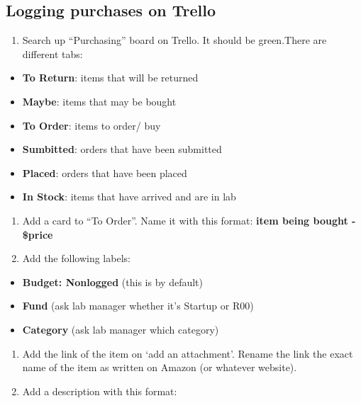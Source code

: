 \documentclass[]{book}
\providecommand{\tightlist}{%
  \setlength{\itemsep}{0pt}\setlength{\parskip}{0pt}}
\begin{document}
\hypertarget{logging-purchases-on-trello}{%
\subsection{Logging purchases on Trello}\label{logging-purchases-on-trello}}

\begin{enumerate}
\def\labelenumi{\arabic{enumi}.}
\tightlist
\item
  Search up ``Purchasing'' board on Trello. It should be green.There are different tabs:
\end{enumerate}

\begin{itemize}
\tightlist
\item
  \textbf{To Return}: items that will be returned
\item
  \textbf{Maybe}: items that may be bought
\item
  \textbf{To Order}: items to order/ buy
\item
  \textbf{Sumbitted}: orders that have been submitted
\item
  \textbf{Placed}: orders that have been placed
\item
  \textbf{In Stock}: items that have arrived and are in lab
\end{itemize}

\begin{enumerate}
\def\labelenumi{\arabic{enumi}.}
\setcounter{enumi}{1}
\item
  Add a card to ``To Order''. Name it with this format: \textbf{item being bought - \$price}
\item
  Add the following labels:
\end{enumerate}

\begin{itemize}
\tightlist
\item
  \textbf{Budget: Nonlogged} (this is by default)
\item
  \textbf{Fund} (ask lab manager whether it's Startup or R00)
\item
  \textbf{Category} (ask lab manager which category)
\end{itemize}

\begin{enumerate}
\def\labelenumi{\arabic{enumi}.}
\setcounter{enumi}{3}
\item
  Add the link of the item on `add an attachment'. Rename the link the exact name of the item as written on Amazon (or whatever website).
\item
  Add a description with this format:
\end{enumerate}
\end{document}
